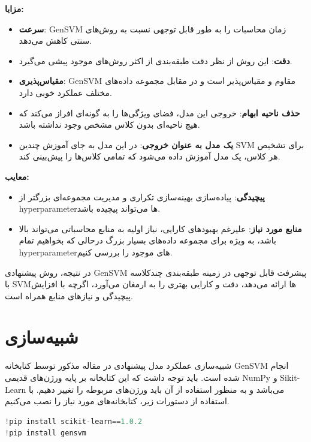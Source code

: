 \documentclass{article}
\begin{document}
\textbf{مزایا:}
\begin{itemize}
    \item \textbf{سرعت}: GenSVM زمان محاسبات را به طور قابل توجهی نسبت به روش‌های سنتی کاهش می‌دهد.
    \item \textbf{دقت}: این روش از نظر دقت طبقه‌بندی از اکثر روش‌های موجود پیشی می‌گیرد.
    \item \textbf{مقیاس‌پذیری}: GenSVM مقاوم و مقیاس‌پذیر است و در مقابل مجموعه داده‌های مختلف عملکرد خوبی دارد.
    \item \textbf{حذف ناحیه ابهام}: خروجی این مدل، فضای ویژگی‌ها را به گونه‌ای افراز می‌کند که هیچ ناحیه‌ای بدون کلاس مشخص وجود نداشته باشد.
    \item \textbf{یک مدل به عنوان خروجی}: در این مدل به جای آموزش چندین SVM برای تشخیص هر کلاس، یک مدل آموزش داده می‌شود که تمامی کلاس‌ها را پیش‌بینی کند.
\end{itemize}

\textbf{معایب:}
\begin{itemize}
    \item \textbf{پیچیدگی}: پیاده‌سازی بهینه‌سازی تکراری و مدیریت مجموعه‌ای بزرگتر از hyperparameterها می‌تواند پیچیده باشد.
    \item \textbf{منابع مورد نیاز}: علیرغم بهبودهای کارایی، نیاز اولیه به منابع محاسباتی می‌تواند بالا باشد، به ویژه برای مجموعه داده‌های بسیار بزرگ درحالی که بخواهیم تمام hyperparameterهای موجود را بررسی کنیم.
\end{itemize}

در نتیجه، روش پیشنهادی GenSVM پیشرفت قابل توجهی در زمینه طبقه‌بندی چندکلاسه با SVMها ارائه می‌دهد، دقت و کارایی بهتری را به ارمغان می‌آورد، اگرچه با افزایش پیچیدگی و نیازهای منابع همراه است.

\section{شبیه‌سازی}

شبیه‌سازی عملکرد مدل پیشنهادی در مقاله مذکور توسط کتابخانه GenSVM انجام شده است. باید توجه داشت که این کتابخانه بر پایه ورژن‌های قدیمی NumPy و Sikit-Learn می‌باشد و به منظور استفاده از آن باید ورژن‌های مربوطه را تغییر دهیم.
با استفاده از دستورات زیر، کتابخانه‌های مورد نیاز را نصب می‌کنیم.
\begin{LTR}
	\begin{lstlisting}[language=Python, caption=Intsall Libraries]
!pip install scikit-learn==1.0.2
!pip install gensvm
	\end{lstlisting}
\end{LTR}
\end{document}
